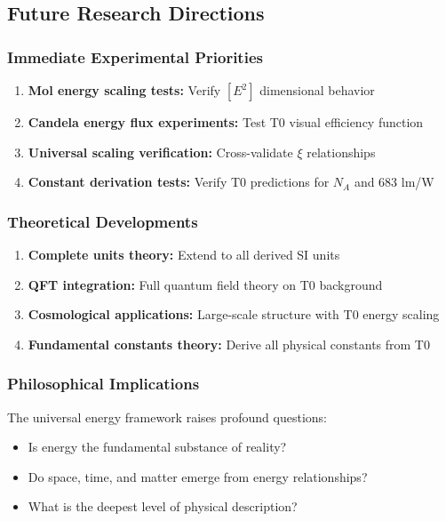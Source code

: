 \documentclass[12pt,a4paper]{article}
\newcommand{\xipar}{\xi}
\begin{document}
	\subsection{Future Research Directions}
	\label{subsec:future_research}
	
	\subsubsection{Immediate Experimental Priorities}
	\label{subsubsec:immediate_experimental}
	
	\begin{enumerate}
		\item \textbf{Mol energy scaling tests:} Verify $[E^2]$ dimensional behavior
		\item \textbf{Candela energy flux experiments:} Test T0 visual efficiency function
		\item \textbf{Universal scaling verification:} Cross-validate $\xipar$ relationships
		\item \textbf{Constant derivation tests:} Verify T0 predictions for $N_A$ and 683 lm/W
	\end{enumerate}
	
	\subsubsection{Theoretical Developments}
	\label{subsubsec:theoretical_developments}
	
	\begin{enumerate}
		\item \textbf{Complete units theory:} Extend to all derived SI units
		\item \textbf{QFT integration:} Full quantum field theory on T0 background
		\item \textbf{Cosmological applications:} Large-scale structure with T0 energy scaling
		\item \textbf{Fundamental constants theory:} Derive all physical constants from T0
	\end{enumerate}
	
	\subsubsection{Philosophical Implications}
	\label{subsubsec:philosophical_implications}
	
	The universal energy framework raises profound questions:
	\begin{itemize}
		\item Is energy the fundamental substance of reality?
		\item Do space, time, and matter emerge from energy relationships?
		\item What is the deepest level of physical description?
	\end{itemize}
	
\end{document}

